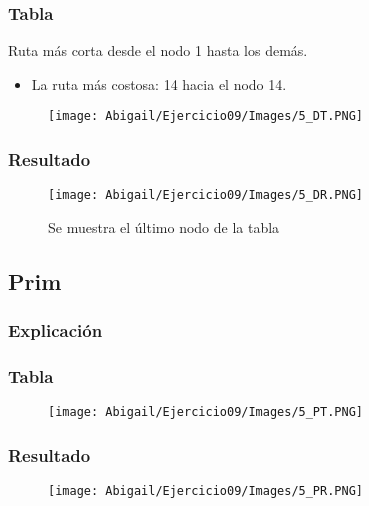 \documentclass[12pt]{article}
\begin{document}
      \subsubsection{Tabla}
        Ruta más corta desde el nodo 1 hasta los demás.

        \begin{itemize}
          \item La ruta más costosa: 14 hacia el nodo 14.
        \end{itemize}

       \begin{figure}[h!]
          \centering
          \texttt{[image: Abigail/Ejercicio09/Images/5\_DT.PNG]}
        \end{figure} 

      \subsubsection{Resultado}
        \begin{figure}[h!]
          \centering
          \texttt{[image: Abigail/Ejercicio09/Images/5\_DR.PNG]}
          \caption{Se muestra el último nodo de la tabla}
        \end{figure} 

    \subsection{Prim}

      \subsubsection{Explicación}

      \subsubsection{Tabla}
        \begin{figure}[h!]
          \centering
          \texttt{[image: Abigail/Ejercicio09/Images/5\_PT.PNG]}
        \end{figure} 

      \subsubsection{Resultado}
        \begin{figure}[h!]
          \centering
          \texttt{[image: Abigail/Ejercicio09/Images/5\_PR.PNG]}
        \end{figure} 
\end{document}
